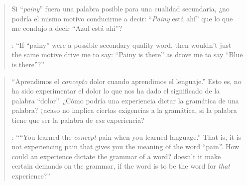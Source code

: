 \blockquote[{\cite[ix]{anscombe1981metaphysics}}: \enquote{If ``painy'' were a possible secondary quality word, then wouldn't just the same motive drive me to say: ``Painy is there'' as drove me to say ``Blue is there''?}]{Si ``\emph{painy}'' fuera una palabra posible para una cualidad secundaria, ¿no podría el mismo motivo conducirme a decir: ``\emph{Painy} está ahí'' que lo que me condujo a decir ``Azul está ahí''?}

\blockquote[{\cite[114]{anscombe1981parmenides:qli}}: \enquote{``You learned the \emph{concept} pain when you learned language.'' That is, it is not experiencing pain that gives you the meaning of the word ``pain''. How could an experience dictate the grammar of a word? \textelp{} doesn't it make certain demands on the grammar, if the word is to be the word for \emph{that} experience?}]{``Aprendimos el \emph{concepto} dolor cuando aprendimos el lenguaje.'' Esto es, no ha sido experimentar el dolor lo que nos ha dado el significado de la palabra ``dolor''. ¿Cómo podría una experiencia dictar la gramática de una palabra? \textelp{} ¿acaso no implica ciertas exigencias a la gramática, si la palabra tiene que ser la palabra de \emph{esa} experiencia?}
